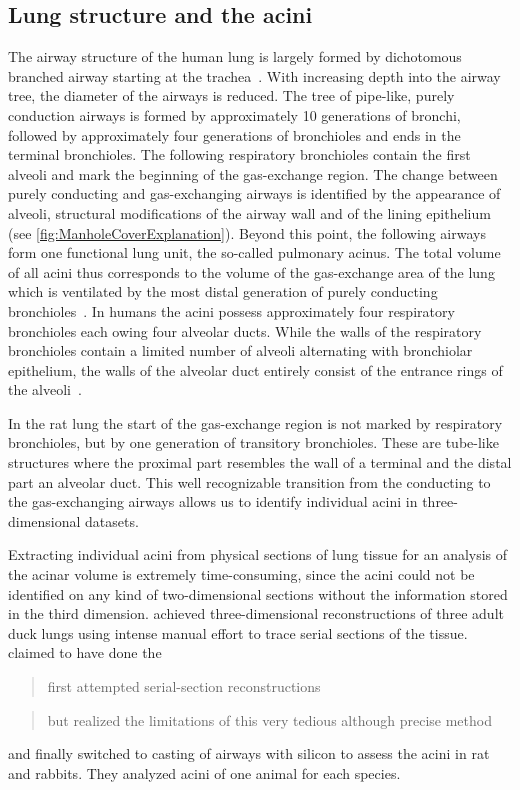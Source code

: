 \documentclass[paper=a4,twocolumn=true,DIV=calc,abstract,english]{scrartcl}
\begin{document}
\subsection{Lung structure and the acini}
The airway structure of the human lung is largely formed by dichotomous branched airway starting at the trachea~\citep{Weibel1991}.
With increasing depth into the airway tree, the diameter of the airways is reduced.
The tree of pipe-like, purely conduction airways is formed by approximately 10 generations of bronchi, followed by approximately four generations of bronchioles and ends in the terminal bronchioles.
The following respiratory bronchioles contain the first alveoli and mark the beginning of the gas-exchange region.
The change between purely conducting and gas-exchanging airways is identified by the appearance of alveoli, structural modifications of the airway wall and of the lining epithelium (see \autoref{fig:ManholeCoverExplanation}).
Beyond this point, the following airways form one functional lung unit, the so-called pulmonary acinus.
The total volume of all acini thus corresponds to the volume of the gas-exchange area of the lung which is ventilated by the most distal generation of purely conducting bronchioles~\citep{Rodriguez1987}.
In humans the acini possess approximately four respiratory bronchioles each owing four alveolar ducts.
While the walls of the respiratory bronchioles contain a limited number of alveoli alternating with bronchiolar epithelium, the walls of the alveolar duct entirely consist of the entrance rings of the alveoli~\citep{Schittny2007}.

In the rat lung the start of the gas-exchange region is not marked by respiratory bronchioles, but by one generation of transitory bronchioles.
These are tube-like structures where the proximal part resembles the wall of a terminal  and the distal part an alveolar duct.
This well recognizable transition from the conducting to the gas-exchanging airways allows us to identify individual acini in three-dimensional datasets.

Extracting individual acini from physical sections of lung tissue for an analysis of the acinar volume is extremely time-consuming, since the acini could not be identified on any kind of two-dimensional sections without the information stored in the third dimension.
\citet{Woodward2005} achieved three-dimensional reconstructions of three adult duck lungs using intense manual effort to trace serial sections of the tissue.
\citet{Rodriguez1987} claimed to have done the \blockquote{first attempted serial-section reconstructions}  \blockquote{but realized the limitations of this very tedious although precise method} and finally switched to casting of airways with silicon to assess the acini in rat and rabbits.
They analyzed acini of one animal for each species.
\end{document}
